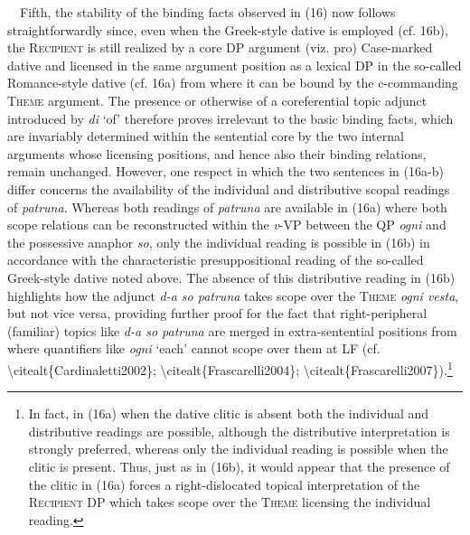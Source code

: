 \documentclass[12pt]{article}
\newenvironment{styleStandard}{\setlength\leftskip{0cm}\setlength\rightskip{0cm plus 1fil}\setlength\parindent{0cm}\setlength\parfillskip{0pt plus 1fil}\setlength\parskip{0cm plus 1pt}\writerlistparindent\writerlistleftskip\leavevmode\normalfont\normalsize\writerlistlabel\ignorespaces}{\unskip\vspace{0cm plus 1pt}\par}
\newcommand\writerlistleftskip{}
\newcommand\writerlistparindent{}
\newcommand\writerlistlabel{}
\begin{document}
\begin{styleStandard}
\ \ Fifth, the stability of the binding facts observed in (16) now follows straightforwardly since, even when the Greek-style dative is employed (cf. 16b), the \textsc{Recipient} is still realized by a core DP argument (viz. pro) Case-marked dative and licensed in the same argument position as a lexical DP in the so-called Romance-style dative (cf. 16a) from where it can be bound by the c-commanding \textsc{Theme} argument. The presence or otherwise of a coreferential topic adjunct introduced by \textit{di }‘of’ therefore proves irrelevant to the basic binding facts, which are invariably determined within the sentential core by the two internal arguments whose licensing positions, and hence also their binding relations, remain unchanged. However, one respect in which the two sentences in (16a-b) differ concerns the availability of the individual and distributive scopal readings of \textit{patruna}. Whereas both readings of \textit{patruna} are available in (16a) where both scope relations can be reconstructed within the \textit{v}{}-VP between the QP \textit{ogni }and the possessive anaphor \textit{so}, only the individual reading is possible in (16b) in accordance with the characteristic presuppositional reading of the so-called Greek-style dative noted above. The absence of this distributive reading in (16b) highlights how the adjunct \textit{d-a so patruna }takes scope over the \textsc{Theme} \textit{ogni vesta}, but not vice versa, providing further proof for the fact that right-peripheral (familiar) topics like \textit{d-a so patruna }are merged in extra-sentential positions from where quantifiers like \textit{ogni }‘each’ cannot scope over them at LF (cf. {\textbackslash}citealt\{Cardinaletti2002\}; {\textbackslash}citealt\{Frascarelli2004\}; {\textbackslash}citealt\{Frascarelli2007\}).\footnote{ In fact, in (16a) when the dative clitic is absent both the individual and distributive readings are possible, although the distributive interpretation is strongly preferred, whereas only the individual reading is possible when the clitic is present. Thus, just as in (16b), it would appear that the presence of the clitic in (16a) forces a right-dislocated topical interpretation of the \textsc{Recipient} DP which takes scope over the \textsc{Theme} licensing the individual reading.}
\end{styleStandard}
\end{document}
